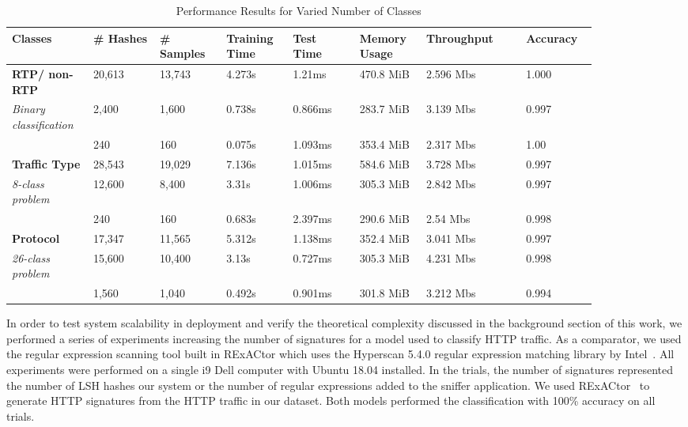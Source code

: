 \begin{table} [ht!]
\caption{Performance Results for Varied Number of Classes}
\centering
\begin{tabular}{| p{0.11\linewidth} | p{0.1\linewidth} | p{0.1\linewidth} | p{0.1\linewidth} | p{0.1\linewidth} | p{0.1\linewidth} | p{0.15\linewidth} | p{0.1\linewidth} |}
\hline
Classes & \# Hashes & \# Samples & Training Time & Test Time & Memory Usage & Throughput & Accuracy \\
\hline
\hline
\textbf{RTP/ non-RTP} & 20,613 & 13,743 & 4.273s & 1.21ms & 470.8 MiB & 2.596 Mb\/s & 1.000 \\
\textit{Binary classification} & 2,400 & 1,600 & 0.738s & 0.866ms & 283.7 MiB & 3.139 Mb\/s & 0.997 \\
& 240 & 160 & 0.075s & 1.093ms & 353.4 MiB & 2.317 Mb\/s & 1.00 \\
\hline
\textbf{Traffic Type} & 28,543 & 19,029 & 7.136s & 1.015ms & 584.6 MiB & 3.728 Mb\/s & 0.997 \\
\textit{8-class problem} & 12,600 & 8,400 & 3.31s & 1.006ms & 305.3 MiB & 2.842 Mb\/s & 0.997 \\
& 240 & 160 & 0.683s & 2.397ms & 290.6 MiB & 2.54 Mb\/s & 0.998 \\
\hline
\textbf{Protocol} & 17,347 & 11,565 & 5.312s & 1.138ms & 352.4 MiB & 3.041 Mb\/s & 0.997 \\
\textit{26-class problem} & 15,600 & 10,400 & 3.13s & 0.727ms & 305.3 MiB & 4.231 Mb\/s & 0.998 \\
& 1,560 & 1,040 & 0.492s & 0.901ms & 301.8 MiB & 3.212 Mb\/s & 0.994 \\
\hline
\end{tabular}
\label{table:performanceresults}
\end{table}

In order to test system scalability in deployment and verify the theoretical complexity discussed in the background section of this work, we performed a series of experiments increasing the number of signatures for a model used to classify HTTP traffic. As a comparator, we used the regular expression scanning tool built in RExACtor which uses the Hyperscan 5.4.0 regular expression matching library by Intel~\cite{hyperscan}. All experiments were performed on a single i9 Dell computer with Ubuntu 18.04 installed. In the trials, the number of signatures represented the number of LSH hashes our system or the number of regular expressions added to the sniffer application. We used RExACtor~\cite{rexactor} to generate HTTP signatures from the HTTP traffic in our dataset. Both models performed the classification with 100\% accuracy on all trials.

